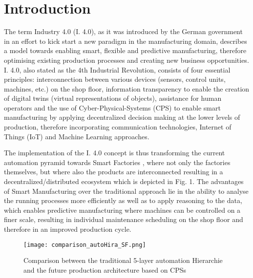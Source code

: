 \section{Introduction}\label{sec:introduction}

The term Industry 4.0 (I. 4.0), as it was introduced by the German government in an effort to kick start a new paradigm in the manufacturing domain, describes a model towards enabling smart, flexible and predictive manufacturing, therefore optimising existing production processes and creating new business opportunities. \cite{i40gov} I. 4.0, also stated as the 4th Industrial Revolution\cite{revolution}, consists of four essential principles: interconnection between various devices (sensors, control units, machines, etc.) on the shop floor, information transparency to enable the creation of digital twins (virtual representations of objects), assistance for human operators and the use of Cyber-Physical-Systems (CPS) to enable smart manufacturing by applying decentralized decision making at the lower levels of production, therefore incorporating communication technologies, Internet of Things (IoT) and Machine Learning approaches. \cite{design}  

The implementation of the I. 4.0 concept is thus transforming the current automation pyramid \cite{autoPy} towards Smart Factories \cite{smartFac}, where not only the factories themselves, but where also the products are interconnected resulting in a decentralized/distributed ecosystem which is depicted in Fig. 1. The advantages of Smart Manufacturing over the traditional approach lie in the ability to analyse the running processes more efficiently as well as to apply reasoning to the data, which enables predictive manufacturing where machines can be controlled on a finer scale, resulting in individual maintenance scheduling on the shop floor and therefore in an improved production cycle.\cite{cpsAdv}

\begin{figure}
	\centering
	\texttt{[image: comparison\_autoHira\_SF.png]}
	\caption{Comparison between the traditional 5-layer automation Hierarchie and the future production architecture based on CPSs}
\end{figure}

